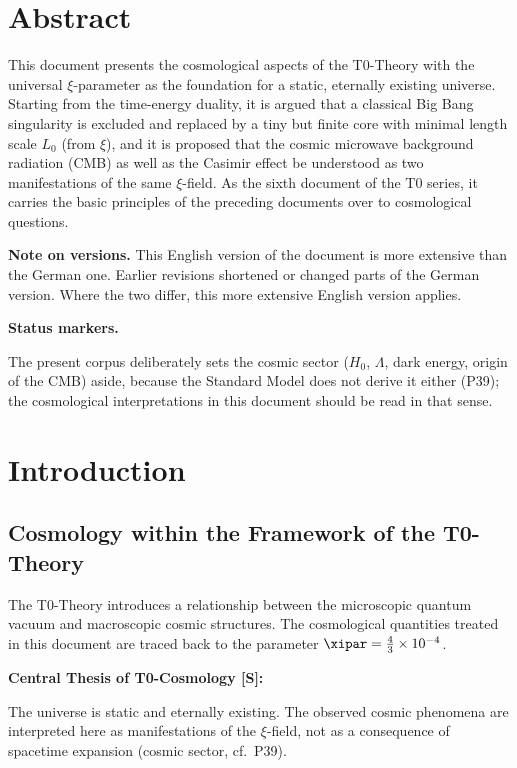 \section*{Abstract}
		This document presents the cosmological aspects of the T0-Theory with the universal $\xi$-parameter as the foundation for a static, eternally existing universe. Starting from the time-energy duality, it is argued that a classical Big Bang singularity is excluded and replaced by a tiny but finite core with minimal length scale $L_0$ (from $\xi$), and it is proposed that the cosmic microwave background radiation (CMB) as well as the Casimir effect be understood as two manifestations of the same $\xi$-field. As the sixth document of the T0 series, it carries the basic principles of the preceding documents over to cosmological questions.

	\medskip\noindent\textbf{Note on versions.} This English version of the document is more extensive than the German one. Earlier revisions shortened or changed parts of the German version. Where the two differ, this more extensive English version applies.


\medskip\noindent\textbf{Status markers.}


\noindent The present corpus deliberately sets the cosmic sector ($H_0$, $\Lambda$, dark energy, origin of the CMB) aside, because the Standard Model does not derive it either (P39); the cosmological interpretations in this document should be read in that sense.

	
	
	\section{Introduction}
	
	\subsection{Cosmology within the Framework of the T0-Theory}
	
	The T0-Theory introduces a relationship between the microscopic quantum vacuum and macroscopic cosmic structures. The cosmological quantities treated in this document are traced back to the parameter $\xipar = \frac{4}{3} \times 10^{-4}$.
	
	\begin{keyresult}
		\textbf{Central Thesis of T0-Cosmology [S]:}
		
		The universe is static and eternally existing. The observed cosmic phenomena are interpreted here as manifestations of the $\xi$-field, not as a consequence of spacetime expansion (cosmic sector, cf.\ P39).
	\end{keyresult}
	
